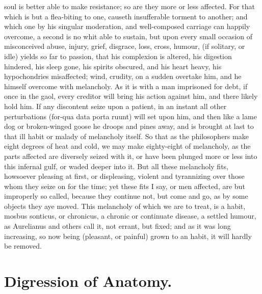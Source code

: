 {soul is better able to make resistance; so are they more or less
affected. For that which is but a flea-biting to one, causeth
insufferable torment to another; and which one by his singular
moderation, and well-composed carriage can happily overcome, a second
is no whit able to sustain, but upon every small occasion of
misconceived abuse, injury, grief, disgrace, loss, cross, humour, \etc{}
(if solitary, or idle) yields so far to passion, that his complexion is
altered, his digestion hindered, his sleep gone, his spirits obscured,
and his heart heavy, his hypochondries misaffected; wind, crudity, on a
sudden overtake him, and he himself overcome with melancholy. As it is
with a man imprisoned for debt, if once in the gaol, every creditor
will bring his action against him, and there likely hold him. If any
discontent seize upon a patient, in an instant all other perturbations
(for-qua data porta ruunt) will set upon him, and then like a lame dog
or broken-winged goose he droops and pines away, and is brought at last
to that ill habit or malady of melancholy itself. So that as the
philosophers make eight degrees of heat and cold, we may make
eighty-eight of melancholy, as the parts affected are diversely seized
with it, or have been plunged more or less into this infernal gulf, or
waded deeper into it. But all these melancholy fits, howsoever pleasing
at first, or displeasing, violent and tyrannizing over those whom they
seize on for the time; yet these fits I say, or men affected, are but
improperly so called, because they continue not, but come and go, as by
some objects they aye moved. This melancholy of which we are to treat,
is a habit, mosbus sonticus, or chronicus, a chronic or continuate
disease, a settled humour, as  Aurelianus and others call it,
not errant, but fixed; and as it was long increasing, so now being
(pleasant, or painful) grown to an habit, it will hardly be removed.


\section{Digression of Anatomy.}

}
